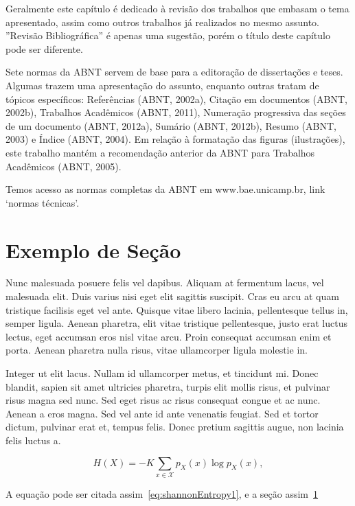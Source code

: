Geralmente este capítulo é dedicado à revisão dos trabalhos que embasam o tema apresentado, assim como outros trabalhos já realizados no mesmo assunto. ”Revisão Bibliográfica” é apenas uma sugestão, porém o título deste capítulo pode ser diferente.

Sete normas da ABNT servem de base para a editoração de dissertações e teses. Algumas trazem uma apresentação do assunto, enquanto outras tratam de tópicos específicos: Referências (ABNT, 2002a), Citação em documentos (ABNT, 2002b), Trabalhos Acadêmicos (ABNT, 2011), Numeração progressiva das seções de um documento (ABNT, 2012a), Sumário (ABNT, 2012b), Resumo (ABNT, 2003) e Índice (ABNT, 2004). Em relação à formatação das figuras (ilustrações), este trabalho mantém a recomendação anterior da ABNT para Trabalhos Acadêmicos (ABNT, 2005).

Temos acesso as normas completas da ABNT em  www.bae.unicamp.br, link ‘normas técnicas’.


\section{Exemplo de Se\c{c}\~{a}o}
\label{sec:sec01}

Nunc malesuada posuere felis vel dapibus. Aliquam at fermentum lacus, vel malesuada elit. Duis varius nisi eget elit sagittis suscipit. Cras eu arcu at quam tristique facilisis eget vel ante. Quisque vitae libero lacinia, pellentesque tellus in, semper ligula. Aenean pharetra, elit vitae tristique pellentesque, justo erat luctus lectus, eget accumsan eros nisl vitae arcu. Proin consequat accumsan enim et porta. Aenean pharetra nulla risus, vitae ullamcorper ligula molestie in.

Integer ut elit lacus. Nullam id ullamcorper metus, et tincidunt mi. Donec blandit, sapien sit amet ultricies pharetra, turpis elit mollis risus, et pulvinar risus magna sed nunc. Sed eget risus ac risus consequat congue et ac nunc. Aenean a eros magna. Sed vel ante id ante venenatis feugiat. Sed et tortor dictum, pulvinar erat et, tempus felis. Donec pretium sagittis augue, non lacinia felis luctus a.

\begin{equation}
H(X) =-K\sum_{x\in\mathcal{X}} p_X(x)\log p_X(x),
\label{eq:shannonEntropy1}
\end{equation}

A equa\c{c}\~{a}o pode ser citada assim~\eqref{eq:shannonEntropy1}, e a se\c{c}\~{a}o assim~\ref{sec:sec01}

